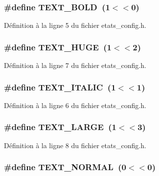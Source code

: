 \subsubsection[{TEXT\_\-BOLD}]{\setlength{\rightskip}{0pt plus 5cm}\#define TEXT\_\-BOLD~(1$<$$<$0)}\label{etats__config_8h_ac6a05036dfbcc5b69c4e3f9b6bbedb2a}


Définition à la ligne 5 du fichier etats\_\-config.h.

\subsubsection[{TEXT\_\-HUGE}]{\setlength{\rightskip}{0pt plus 5cm}\#define TEXT\_\-HUGE~(1$<$$<$2)}\label{etats__config_8h_a6da9ea675cad4cae380d40effba08953}


Définition à la ligne 7 du fichier etats\_\-config.h.

\subsubsection[{TEXT\_\-ITALIC}]{\setlength{\rightskip}{0pt plus 5cm}\#define TEXT\_\-ITALIC~(1$<$$<$1)}\label{etats__config_8h_a7000b34e44b52793133316521b6bf486}


Définition à la ligne 6 du fichier etats\_\-config.h.

\subsubsection[{TEXT\_\-LARGE}]{\setlength{\rightskip}{0pt plus 5cm}\#define TEXT\_\-LARGE~(1$<$$<$3)}\label{etats__config_8h_aad16158a590754a5968d016e87369945}


Définition à la ligne 8 du fichier etats\_\-config.h.

\subsubsection[{TEXT\_\-NORMAL}]{\setlength{\rightskip}{0pt plus 5cm}\#define TEXT\_\-NORMAL~(0$<$$<$0)}\label{etats__config_8h_a1ed152a52803941ba905e814b126abbb}


